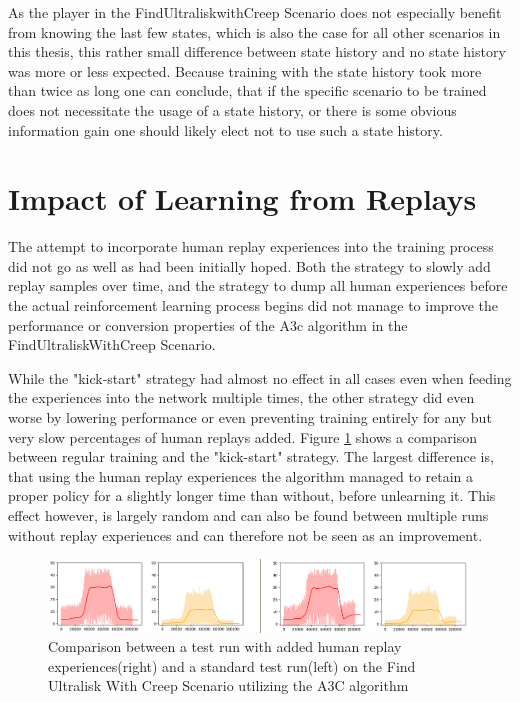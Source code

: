 As the player in the FindUltraliskwithCreep Scenario does not especially benefit from knowing the last few states, which is also the case for all other scenarios in this thesis, this rather small difference between state history and no state history was more or less expected. 
Because training with the state history took more than twice as long one can conclude, that if the specific scenario to be trained does not necessitate the usage of a state history, or there is some obvious information gain one should likely elect not to use such a state history.  


\section{Impact of Learning from Replays}
The attempt to incorporate human replay experiences into the training process did not go as well as had been initially hoped. 
Both the strategy to slowly add replay samples over time, and the strategy to dump all human experiences before the actual reinforcement learning process begins did not manage to improve the performance or conversion properties of the A3c algorithm in the FindUltraliskWithCreep Scenario.

While the "kick-start" strategy had almost no effect in all cases even when feeding the experiences into the network multiple times, the other strategy did even worse by lowering performance or even preventing training entirely for any but very slow percentages of human replays added. Figure  \ref{fig:a3c_replay} shows a comparison between regular training and the "kick-start" strategy. The largest difference is, that using the human replay experiences the algorithm managed to retain a proper policy for a slightly longer time than without, before unlearning it. This effect however, is largely random and can also be found between multiple runs without replay experiences and can therefore not be seen as an improvement. 

\begin{figure}[htb]
  \centering
      \includegraphics[width=1\textwidth]{Figures/plots/a3c_fuwc_replays.png}
  \caption{Comparison between a test run with added human replay experiences(right) and a standard test run(left) on the Find Ultralisk With Creep Scenario utilizing the A3C algorithm}
  \label{fig:a3c_replay}
\end{figure}

